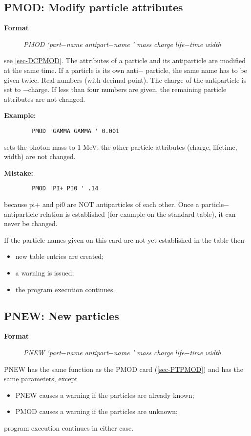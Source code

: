 \subsection{\label{sec-PTPMOD}PMOD: Modify particle attributes}
\par
\begin{description}\item[\bf{Format}]
{\it PMOD `part$-$name antipart$-$name ' mass charge life$-$time width}
\end{description}
\begin{indentlist}{ 3.75cm}{ 4.00cm}
see \ref{sec-DCPMOD}.
The attributes of a particle and its antiparticle are
modified at the same time. If a particle is its own anti$-$
particle, the same name has to be given twice.
Real numbers (with decimal point).
The charge of the antiparticle is set to $-$charge. If less than
four numbers are given, the remaining particle attributes
are not changed.
\end{indentlist}
\par
{\bf Example:}
\begin{verbatim}
        PMOD 'GAMMA GAMMA ' 0.001
\end{verbatim}
\par sets the photon mass to 1 MeV; the other particle
attributes (charge, lifetime, width) are not changed.
\par
{\bf Mistake:}
\begin{verbatim}
        PMOD 'PI+ PI0 ' .14
\end{verbatim}
\par because pi+ and pi0 are NOT antiparticles of each other.
Once a particle$-$antiparticle relation is established (for
example on the standard table), it can never be changed.
\par If the particle names given on this card are not yet established
in the
table then
\begin{itemize}
\item new table entries are created;
\item a warning is issued;
\item the program execution continues.
\end{itemize}
\subsection{\label{sec-PTPNEW}PNEW: New particles}
\par
\begin{description}\item[\bf{Format
}]
{\it PNEW `part$-$name antipart$-$name ' mass charge life$-$time width}
\end{description}
PNEW has the same function as the PMOD card
(\ref{sec-PTPMOD}) and has the same parameters, except
\begin{itemize}
\item PNEW causes a warning if the particles are already known;
\item PMOD causes a warning if the particles are unknown;
\end{itemize}
program execution continues in either case.
\par
